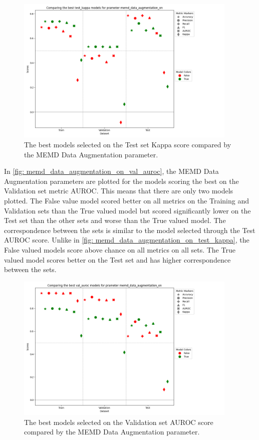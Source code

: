 \begin{figure}[H]
    \centering
    \includegraphics[width=400px]{Figures/results/memd_data_augmentation_on/memd_data_augmentation_on_test_kappa.png}
    \caption{The best models selected on the Test set Kappa score compared by the MEMD Data Augmentation parameter.}
    \label{fig: memd_data_augmentation_on_test_kappa}
\end{figure}

In \autoref{fig: memd_data_augmentation_on_val_auroc}, the MEMD Data Augmentation parameters are plotted for the models scoring the best on the Validation set metric AUROC. This means that there are only two models plotted. The False value model scored better on all metrics on the Training and Validation sets than the True valued model but scored significantly lower on the Test set than the other sets and worse than the True valued model. The correspondence between the sets is similar to the model selected through the Test AUROC score. Unlike in \autoref{fig: memd_data_augmentation_on_test_kappa}, the False valued models score above chance on all metrics on all sets. The True valued model scores better on the Test set and has higher correspondence between the sets.


\begin{figure}[H]
    \centering
    \includegraphics[width=400px]{Figures/results/memd_data_augmentation_on/memd_data_augmentation_on_val_auroc.png}
    \caption{The best models selected on the Validation set AUROC score compared by the MEMD Data Augmentation parameter.}
    \label{fig: memd_data_augmentation_on_val_auroc}
\end{figure}

